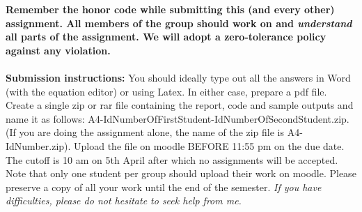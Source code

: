 \documentclass[11pt]{article}
\begin{document}
\maketitle

\textbf{Remember the honor code while submitting this (and every other) assignment. All members of the group should work on and \emph{understand} all parts of the assignment. We will adopt a \textbf{zero-tolerance policy} against any violation.}
\\
\\
\textbf{Submission instructions:} You should ideally type out all the answers in Word (with the equation editor) or using Latex. In either case, prepare a pdf file. Create a single zip or rar file containing the report, code and sample outputs and name it as follows: A4-IdNumberOfFirstStudent-IdNumberOfSecondStudent.zip. (If you are doing the assignment alone, the name of the zip file is A4-IdNumber.zip). Upload the file on moodle BEFORE 11:55 pm on the due date. The cutoff is 10 am on 5th April after which no assignments will be accepted. Note that only one student per group should upload their work on moodle. Please preserve a copy of all your work until the end of the semester. \emph{If you have difficulties, please do not hesitate to seek help from me.} 
\end{document}
